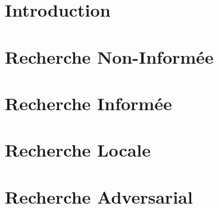 \documentclass[a4paper, 12pt]{extarticle}
\begin{document}


\makemargins %
\makefrontpage
\maketoc


% 



\section{Introduction} %
\label{sec:introduction}

\newpage



\section{Recherche Non-Informée} %
\label{sec:recherche}



\section{Recherche Informée} %
\label{sec:recherche_informee} 

\newpage

\section{Recherche Locale} %
\label{sec:recherche_locale}



\section{Recherche Adversarial} %
\label{sec:recherche_adversarial}


\end{document}
